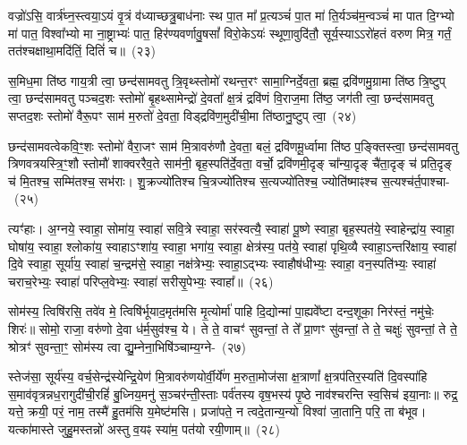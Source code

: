 वज्रो॑\-ऽसि॒ वार्त्र॑घ्न॒स्त्वया॒ऽयं वृ॒त्रं व॑ध्याच्छत्रु॒बाध॑नाः स्थ पा॒त मा᳚ प्र॒त्यञ्चं॑ पा॒त मा॑ ति॒र्यञ्च॑म॒न्वञ्चं॑ मा पात दि॒ग्भ्यो मा॑ पात॒ विश्वा᳚भ्यो मा ना॒ष्ट्राभ्यः॑ पात॒ हिर॑ण्यवर्णावु॒षसां᳚ विरो॒के\-ऽयः॑ स्थूणा॒वुदि॑तौ॒ सूर्य॒स्या\-ऽ\-ऽरो॑हतं वरुण मित्र॒ गर्तं॒ तत॑श्चक्षाथा॒मदि॑तिं॒ दितिं॑ च॥~(२३)

{\anuvakamend[{शिशु॒रिन्द्र॒स्यैक॑चत्वारिꣳशच्च}]}%

स॒मिध॒मा ति॑ष्ठ गाय॒त्री त्वा॒ छन्द॑सामवतु त्रि॒वृथ्स्तोमो॑ रथन्त॒रꣳ सामा॒ग्निर्दे॒वता॒ ब्रह्म॒ द्रवि॑णमु॒ग्रामा ति॑ष्ठ त्रि॒ष्टुप् त्वा॒ छन्द॑सामवतु पञ्चद॒शः स्तोमो॑ बृ॒हथ्सामेन्द्रो॑ दे॒वता᳚ क्ष॒त्रं द्रवि॑णं वि॒राज॒मा ति॑ष्ठ॒ जग॑ती त्वा॒ छन्द॑सामवतु सप्तद॒शः स्तोमो॑ वैरू॒पꣳ साम॑ म॒रुतो॑ दे॒वता॒ विड्द्रवि॑ण॒मुदी॑ची॒मा ति॑ष्ठानु॒ष्टुप् त्वा॒~(२४)

छन्द॑सामवत्वेकवि॒ꣳ॒शः स्तोमो॑ वैरा॒जꣳ साम॑ मि॒त्रावरु॑णौ दे॒वता॒ बलं॒ द्रवि॑णमू॒र्ध्वामा ति॑ष्ठ प॒ङ्क्तिस्त्वा॒ छन्द॑सामवतु त्रिणवत्रयस्त्रि॒ꣳ॒शौ स्तोमौ॑ शाक्वररैव॒ते साम॑नी॒ बृह॒स्पति॑र्दे॒वता॒ वर्चो॒ द्रवि॑णमी॒दृङ् चा᳚न्या॒दृङ् चै॑ता॒दृङ् च॑ प्रति॒दृङ् च॑ मि॒तश्च॒ सम्मि॑तश्च॒ सभ॑राः। शु॒क्रज्यो॑तिश्च चि॒त्रज्यो॑तिश्च स॒त्यज्यो॑तिश्च॒ ज्योति॑ष्माꣴश्च स॒त्यश्च॑र्त॒पाश्चा-~(२५)

त्यꣳ॑हाः। अ॒ग्नये॒ स्वाहा॒ सोमा॑य॒ स्वाहा॑ सवि॒त्रे स्वाहा॒ सर॑स्वत्यै॒ स्वाहा॑ पू॒ष्णे स्वाहा॒ बृह॒स्पत॑ये॒ स्वाहेन्द्रा॑य॒ स्वाहा॒ घोषा॑य॒ स्वाहा॒ श्लोका॑य॒ स्वाहा\-ऽꣳशा॑य॒ स्वाहा॒ भगा॑य॒ स्वाहा॒ क्षेत्र॑स्य॒ पत॑ये॒ स्वाहा॑ पृथि॒व्यै स्वाहा॒\-ऽन्तरि॑क्षाय॒ स्वाहा॑ दि॒वे स्वाहा॒ सूर्या॑य॒ स्वाहा॑ च॒न्द्रम॑से॒ स्वाहा॒ नक्ष॑त्रेभ्यः॒ स्वाहा॒\-ऽद्भ्यः स्वाहौष॑धीभ्यः॒ स्वाहा॒ वन॒स्पति॑भ्यः॒ स्वाहा॑ चराच॒रेभ्यः॒ स्वाहा॑ परिप्ल॒वेभ्यः॒ स्वाहा॑ सरीसृ॒पेभ्यः॒ स्वाहा᳚॥~(२६)

{\anuvakamend[{अ॒नु॒ष्टुप्त्व॑र्त॒पाश्च॑ सरीसृ॒पेभ्यः॒ स्वाहा᳚}]}%

सोम॑स्य॒ त्विषि॑रसि॒ तवे॑व मे॒ त्विषि॑र्भूयाद॒मृत॑मसि मृ॒त्योर्मा॑ पाहि दि॒द्योन्मा॑ पा॒ह्यवे᳚ष्टा दन्द॒शूका॒ निर॑स्तं॒ नमु॑चेः॒ शिरः॑॥ सोमो॒ राजा॒ वरु॑णो दे॒वा ध॑र्म॒सुव॑श्च॒ ये। ते ते॒ वाचꣳ॑ सुवन्तां॒ ते ते᳚ प्रा॒णꣳ सु॑वन्तां॒ ते ते॒ चक्षुः॑ सुवन्तां॒ ते ते॒ श्रोत्रꣳ॑ सुवन्ता॒ꣳ॒ सोम॑स्य त्वा द्यु॒म्नेना॒भिषि॑ञ्चाम्य॒ग्ने-~(२७)

स्तेज॑सा॒ सूर्य॑स्य॒ वर्च॒सेन्द्र॑स्येन्द्रि॒येण॑ मि॒त्रावरु॑णयोर्वी॒र्ये॑ण म॒रुता॒\-मोज॑सा क्ष॒त्राणां᳚ क्ष॒त्रप॑तिर॒स्यति॑ दि॒वस्पा॑हि स॒माव॑वृत्रन्नध॒रा\-गुदी॑ची॒\-रहिं॑ बु॒ध्निय॒मनु॑ स॒ञ्चर॑न्ती॒स्ताः पर्व॑तस्य वृष॒भस्य॑ पृ॒ष्ठे नाव॑श्चरन्ति स्व॒सिच॑ इया॒नाः॥ रुद्र॒ यत्ते॒ क्रयी॒ परं॒ नाम॒ तस्मै॑ हु॒तम॑सि य॒मेष्ट॑मसि। प्रजा॑पते॒ न त्वदे॒तान्य॒न्यो विश्वा॑ जा॒तानि॒ परि॒ ता ब॑भूव। यत्का॑मास्ते जुहु॒मस्तन्नो॑ अस्तु व॒यꣴ स्या॑म॒ पत॑यो रयी॒णाम्॥~(२८)

